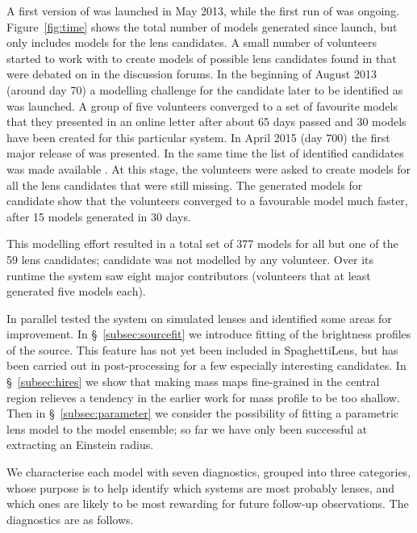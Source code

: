 A first version of \SpL was launched in May 2013, while the first run of \SW was ongoing.
Figure~\ref{fig:time} shows the total number of models generated since launch, but only includes models for the lens candidates.
A small number of volunteers started to work with \SpL to create models of possible lens candidates found in \SW that were debated on in the \SW discussion forums.
In the beginning of August 2013 (around day 70) a modelling challenge for the candidate later to be identified as  was launched.
A group of five volunteers converged to a set of favourite models that they presented in an online letter after about 65 days passed and 30 models have been created for this particular system.
In April 2015 (day 700) the first major release of \SpL was presented.
In the same time the list of identified candidates was made available \citep[as a preprint of][]{2016MNRAS.455.1191M}.
At this stage, the volunteers were asked to create models for all the lens candidates that were still missing.
The generated models for candidate  show that the volunteers converged to a favourable model much faster, after 15 models generated in 30 days.

This modelling effort resulted in a total set of 377 \SpL models for all but one of the 59 \SW lens candidates; candidate  was not modelled by any volunteer.
Over its runtime the system saw eight major contributors (volunteers that at least generated five models each).

In parallel \cite{2015MNRAS.447.2170K} tested the system
on simulated lenses and identified some areas for improvement.  In
\S~\ref{subsec:sourcefit} we introduce fitting of the brightness
profiles of the source.  This feature has not yet been included in
SpaghettiLens, but has been carried out in post-processing for a few
especially interesting candidates.  In \S~\ref{subsec:hires} we show
that making mass maps fine-grained in the central region relieves a
tendency in the earlier work for mass profile to be too shallow. Then in
\S~\ref{subsec:parameter} we consider the possibility of fitting a
parametric lens model to the model ensemble; so far we have only been
successful at extracting an Einstein radius.


We characterise each model with seven diagnostics, grouped into three 
categories, whose purpose is to help identify which systems are most probably 
lenses, and which ones are likely to be most rewarding for future follow-up 
observations. The diagnostics are as follows.

